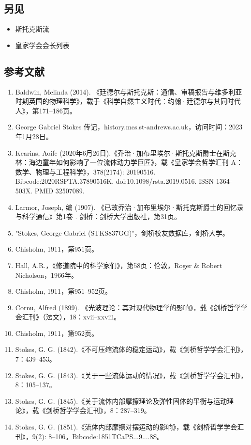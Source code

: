 \subsection{另见}
\begin{itemize}
\item 斯托克斯流
\item 皇家学会会长列表
\end{itemize}
\subsection{参考文献}
\begin{enumerate}
\item Baldwin, Melinda (2014). 《廷德尔与斯托克斯：通信、审稿报告与维多利亚时期英国的物理科学》，载于《科学自然主义时代：约翰·廷德尔与其同时代人》，第171–186页。
\item George Gabriel Stokes 传记，history.mcs.st-andrews.ac.uk，访问时间：2023年1月28日。
\item Kearins, Aoife (2020年6月26日).《乔治·加布里埃尔·斯托克斯爵士在斯克林：海边童年如何影响了一位流体动力学巨匠》，载《皇家学会哲学汇刊 A：数学、物理与工程科学》，378(2174): 20190516. Bibcode:2020RSPTA.37890516K. doi:10.1098/rsta.2019.0516. ISSN 1364-503X. PMID 32507089.
\item Larmor, Joseph, 编 (1907). 《已故乔治·加布里埃尔·斯托克斯爵士的回忆录与科学通信》第1卷 . 剑桥：剑桥大学出版社，第31页。
\item "Stokes, George Gabriel (STKS837GG)"，剑桥校友数据库，剑桥大学。
\item Chisholm, 1911，第951页。
\item Hall, A.R.，《修道院中的科学家们》，第58页：伦敦，Roger & Robert Nicholson，1966年。
\item Chisholm, 1911，第951–952页。
\item Cornu, Alfred (1899). 《光波理论：其对现代物理学的影响》，载《剑桥哲学学会汇刊》（法文），18：xvii–xxviii。
\item Chisholm, 1911，第952页。
\item Stokes, G. G. (1842).《不可压缩流体的稳定运动》，载《剑桥哲学学会汇刊》，7：439–453。
\item Stokes, G. G. (1843).《关于一些流体运动的情况》，载《剑桥哲学学会汇刊》，8：105–137。
\item Stokes, G. G. (1845).《关于流体内部摩擦理论及弹性固体的平衡与运动理论》，载《剑桥哲学学会汇刊》，8：287–319。
\item Stokes, G. G. (1851).《流体内部摩擦对摆运动的影响》，载《剑桥哲学学会汇刊》，9(2): 8–106。Bibcode:1851TCaPS...9....8S。

\end{enumerate}
